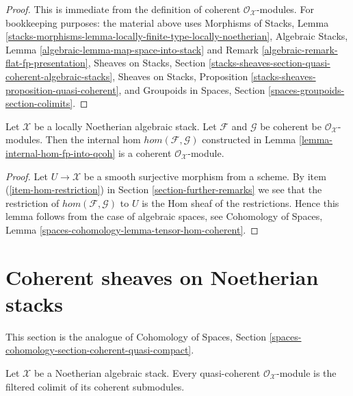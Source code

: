 \begin{proof}
This is immediate from the definition of coherent
$\mathcal{O}_\mathcal{X}$-modules.
For bookkeeping purposes: the material above uses
Morphisms of Stacks, Lemma
\ref{stacks-morphisms-lemma-locally-finite-type-locally-noetherian},
Algebraic Stacks, Lemma \ref{algebraic-lemma-map-space-into-stack} and
Remark \ref{algebraic-remark-flat-fp-presentation},
Sheaves on Stacks, Section
\ref{stacks-sheaves-section-quasi-coherent-algebraic-stacks},
Sheaves on Stacks, Proposition \ref{stacks-sheaves-proposition-quasi-coherent},
and Groupoids in Spaces, Section
\ref{spaces-groupoids-section-colimits}.
\end{proof}

\begin{lemma}
\label{lemma-coherent-hom}
Let $\mathcal{X}$ be a locally Noetherian algebraic stack. Let $\mathcal{F}$
and $\mathcal{G}$ be coherent be $\mathcal{O}_\mathcal{X}$-modules. Then
the internal hom $hom(\mathcal{F}, \mathcal{G})$
constructed in Lemma \ref{lemma-internal-hom-fp-into-qcoh}
is a coherent $\mathcal{O}_\mathcal{X}$-module.
\end{lemma}

\begin{proof}
Let $U \to \mathcal{X}$ be a smooth surjective morphism from a scheme.
By item (\ref{item-hom-restriction}) in Section \ref{section-further-remarks}
we see that the restriction of
$hom(\mathcal{F}, \mathcal{G})$ to $U$ is the Hom sheaf of the restrictions.
Hence this lemma follows from the case of algebraic spaces, see
Cohomology of Spaces, Lemma \ref{spaces-cohomology-lemma-tensor-hom-coherent}.
\end{proof}






\section{Coherent sheaves on Noetherian stacks}
\label{section-coherent-on-noetherian}

\noindent
This section is the analogue of
Cohomology of Spaces, Section
\ref{spaces-cohomology-section-coherent-quasi-compact}.

\begin{lemma}
\label{lemma-directed-colimit-coherent}
Let $\mathcal{X}$ be a Noetherian algebraic stack. Every quasi-coherent
$\mathcal{O}_\mathcal{X}$-module is the filtered colimit of its coherent
submodules.
\end{lemma}

